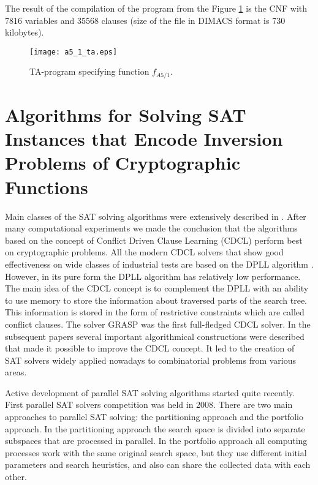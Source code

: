 \documentclass[runningheads,a4paper]{llncs}
\begin{document}
The result of the compilation of the program from the Figure \ref{a5_1_ta_program} is the CNF with 7816 variables and 35568 clauses (size of the file in DIMACS format is 730 kilobytes).

\begin{figure}[ht]
	\centering
		\texttt{[image: a5\_1\_ta.eps]}
	\caption{TA-program specifying function $f_{A5/1}$.}
	\label{a5_1_ta_program}
\end{figure}

\section{Algorithms for Solving SAT Instances that Encode Inversion Problems of Cryptographic Functions}

Main classes of the SAT solving algorithms were extensively described in \cite{DBLP:series/faia/2009-185}. After many computational experiments we made the conclusion that the algorithms based on the concept of Conflict Driven Clause Learning (CDCL) \cite{DBLP:series/faia/SilvaLM09} perform best on cryptographic problems. All the modern CDCL solvers that show good effectiveness on wide classes of industrial tests are based on the DPLL algorithm \cite{Davis:1962:MPT:368273.368557}. However, in its pure form the DPLL algorithm has relatively low performance. The main idea of the CDCL concept is to complement the DPLL with an ability to use memory to store the information about traversed parts of the search tree. This information is stored in the form of restrictive constraints which are called conflict clauses. The solver GRASP \cite{DBLP:journals/tc/Marques-SilvaS99} was the first full-fledged CDCL solver. In the subsequent papers \cite{DBLP:conf/iccad/ZhangMMM01,DBLP:conf/dac/MoskewiczMZZM01} several important algorithmical constructions were described that made it possible to improve the CDCL concept. It led to the creation of SAT solvers widely applied nowadays to combinatorial problems from various areas. 

Active development of parallel SAT solving algorithms started quite recently. First parallel SAT solvers competition was held in 2008. There are two main approaches to parallel SAT solving: the partitioning approach and the portfolio approach. In the partitioning approach the search space is divided into separate subspaces that are processed in parallel. In the portfolio approach all computing processes work with the same original search space, but they use different initial parameters and search heuristics, and also can share the collected data with each other.
\end{document}
